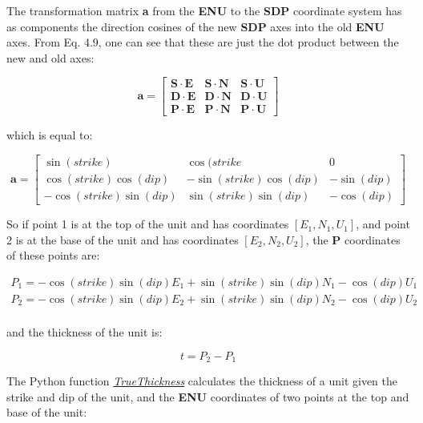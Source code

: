 \documentclass[a4paper , 12pt]{book}
\begin{document}
The transformation matrix \textbf{a} from the \textbf{ENU} to the \textbf{SDP} coordinate system has as components the direction cosines of the new \textbf{SDP} axes into the old \textbf{ENU} axes. From Eq. 4.9, one can see that these are just the dot product between the new and old axes:

\begin{equation*}
    \textbf{a}=
    \begin{bmatrix}
    \mathbf{S}\cdot\mathbf{E} & \mathbf{S}\cdot\mathbf{N} & \mathbf{S}\cdot\mathbf{U} \\
    \mathbf{D}\cdot\mathbf{E} & \mathbf{D}\cdot\mathbf{N} & \mathbf{D}\cdot\mathbf{U} \\
    \mathbf{P}\cdot\mathbf{E} & \mathbf{P}\cdot\mathbf{N} & \mathbf{P}\cdot\mathbf{U}
\end{bmatrix}
\end{equation*}

which is equal to:

\begin{equation}
    \textbf{a}=
    \begin{bmatrix}
    \sin(strike) & \cos(strike & 0 \\
    \cos(strike)\cos(dip) & -\sin(strike)\cos(dip) & -\sin(dip) \\
    -\cos(strike)\sin(dip) & \sin(strike)\sin(dip) & -\cos(dip)
\end{bmatrix}
\end{equation}

So if point 1 is at the top of the unit and has coordinates $[E_1,N_1,U_1]$, and point 2 is at the base of the unit and has coordinates $[E_2,N_2,U_2]$, the \textbf{P} coordinates of these points are:

\begin{equation}
    \begin{split}
        P_1 = -\cos(strike)\sin(dip)E_1+\sin(strike)\sin(dip)N_1-\cos(dip)U_1  \\
        P_2 = -\cos(strike)\sin(dip)E_2+\sin(strike)\sin(dip)N_2-\cos(dip)U_2  \\
    \end{split}
\end{equation}

and the thickness of the unit is:

\begin{equation}
    t = P_2-P_1
\end{equation}{}

The Python function \href{http://github.com}{\textit{TrueThickness}} calculates the thickness of a unit given the strike and dip of the unit, and the \textbf{ENU} coordinates of two points at the top and base of the unit:
\end{document}
